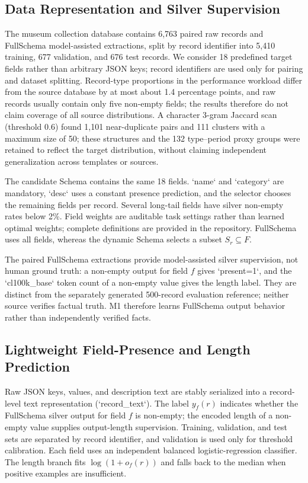 \documentclass[runningheads]{llncs}
\newcommand{\method}{M1}
\newcommand{\full}{FullSchema}
\begin{document}
\subsection{Data Representation and Silver Supervision}

The museum collection database contains 6,763 paired raw records and \full{} model-assisted extractions, split by record identifier into 5,410 training, 677 validation, and 676 test records. We consider 18 predefined target fields rather than arbitrary JSON keys; record identifiers are used only for pairing and dataset splitting. Record-type proportions in the performance workload differ from the source database by at most about 1.4 percentage points, and raw records usually contain only five non-empty fields; the results therefore do not claim coverage of all source distributions. A character 3-gram Jaccard scan (threshold 0.6) found 1,101 near-duplicate pairs and 111 clusters with a maximum size of 50; these structures and the 132 type--period proxy groups were retained to reflect the target distribution, without claiming independent generalization across templates or sources.

 The candidate Schema contains the same 18 fields. `name` and `category` are mandatory, `desc` uses a constant presence prediction, and the selector chooses the remaining fields per record. Several long-tail fields have silver non-empty rates below 2\%. Field weights are auditable task settings rather than learned optimal weights; complete definitions are provided in the repository. \full{} uses all fields, whereas the dynamic Schema selects a subset $S_r\subseteq F$.

The paired \full{} extractions provide model-assisted silver supervision, not human ground truth: a non-empty output for field $f$ gives `present=1`, and the `cl100k_base` token count of a non-empty value gives the length label. They are distinct from the separately generated 500-record evaluation reference; neither source verifies factual truth. \method{} therefore learns \full{} output behavior rather than independently verified facts.

\subsection{Lightweight Field-Presence and Length Prediction}

Raw JSON keys, values, and description text are stably serialized into a record-level text representation (`record_text`). The label $y_f(r)$ indicates whether the \full{} silver output for field $f$ is non-empty; the encoded length of a non-empty value supplies output-length supervision. Training, validation, and test sets are separated by record identifier, and validation is used only for threshold calibration. Each field uses an independent balanced logistic-regression classifier. The length branch fits $\log(1+o_f(r))$ and falls back to the median when positive examples are insufficient.
\end{document}

